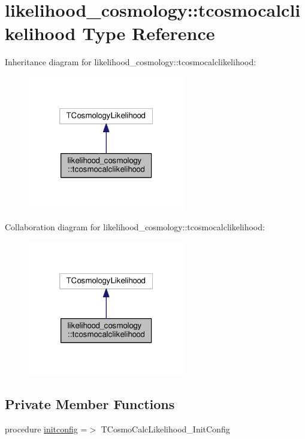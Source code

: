 \hypertarget{structlikelihood__cosmology_1_1tcosmocalclikelihood}{}\section{likelihood\+\_\+cosmology\+:\+:tcosmocalclikelihood Type Reference}
\label{structlikelihood__cosmology_1_1tcosmocalclikelihood}


Inheritance diagram for likelihood\+\_\+cosmology\+:\+:tcosmocalclikelihood\+:
\nopagebreak
\begin{figure}[H]
\begin{center}
\leavevmode
\includegraphics[width=194pt]{structlikelihood__cosmology_1_1tcosmocalclikelihood__inherit__graph}
\end{center}
\end{figure}


Collaboration diagram for likelihood\+\_\+cosmology\+:\+:tcosmocalclikelihood\+:
\nopagebreak
\begin{figure}[H]
\begin{center}
\leavevmode
\includegraphics[width=194pt]{structlikelihood__cosmology_1_1tcosmocalclikelihood__coll__graph}
\end{center}
\end{figure}
\subsection*{Private Member Functions}
\begin{DoxyCompactItemize}
\item 
procedure \mbox{\hyperlink{structlikelihood__cosmology_1_1tcosmocalclikelihood_a33eb387999b26a6b0adbb8da886d050e}{initconfig}} =$>$ T\+Cosmo\+Calc\+Likelihood\+\_\+\+Init\+Config
\end{DoxyCompactItemize}
